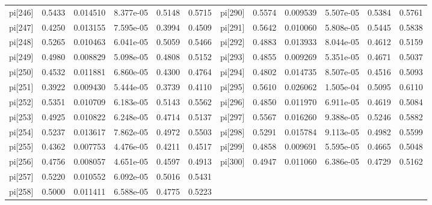 \documentclass[12pt]{article}
\begin{document}
\begin{table}[h!]
\begin{tabular}{|llllll|llllll}
pi[246] & 0.5433 & 0.014510 & 8.377e-05 &0.5148 &0.5715 & pi[290] & 0.5574 & 0.009539 & 5.507e-05 & 0.5384 &0.5761 \\
pi[247] & 0.4250 & 0.013155 & 7.595e-05 &0.3994 & 0.4509 & pi[291] & 0.5642 & 0.010060 & 5.808e-05 & 0.5445 &0.5838 \\
pi[248] & 0.5265 & 0.010463 & 6.041e-05 &0.5059&0.5466 & pi[292] & 0.4883 & 0.013933 & 8.044e-05 & 0.4612 &0.5159 \\
pi[249] & 0.4980 & 0.008829 & 5.098e-05 &0.4808 &0.5152 & pi[293] & 0.4855 & 0.009269 & 5.351e-05 & 0.4671 &0.5037 \\
pi[250] & 0.4532 & 0.011881 & 6.860e-05 & 0.4300 & 0.4764& pi[294] & 0.4802 & 0.014735 & 8.507e-05 & 0.4516 &0.5093 \\
pi[251] & 0.3922 & 0.009430 & 5.444e-05 &0.3739  &0.4110 & pi[295] & 0.5610 & 0.026062 & 1.505e-04 & 0.5095 &0.6110 \\ 
pi[252] & 0.5351 & 0.010709 & 6.183e-05 & 0.5143 & 0.5562 & pi[296] & 0.4850 & 0.011970 & 6.911e-05 &0.4619 &0.5084 \\ 
pi[253] & 0.4925 & 0.010822 & 6.248e-05 & 0.4714 &0.5137 & pi[297] & 0.5567 & 0.016260 & 9.388e-05 & 0.5246 &0.5882 \\
pi[254] & 0.5237 & 0.013617 & 7.862e-05 & 0.4972 & 0.5503 & pi[298] & 0.5291 & 0.015784 & 9.113e-05 & 0.4982 &0.5599 \\ 
pi[255] & 0.4362 & 0.007753 & 4.476e-05 & 0.4211&0.4517 & pi[299] & 0.4858 & 0.009691 & 5.595e-05 
& 0.4665 &0.5048 \\ 
pi[256] & 0.4756 & 0.008057 & 4.651e-05 &0.4597 & 0.4913& pi[300] & 0.4947 & 0.011060 & 6.386e-05 & 0.4729 &0.5162 \\ 
pi[257] & 0.5220 & 0.010552 & 6.092e-05 &0.5016  &0.5431 \\ 
pi[258] & 0.5000 & 0.011411 & 6.588e-05 &0.4775 & 0.5223\\ 
\hline

\hline
\end{tabular}
\end{table}
\end{document}
